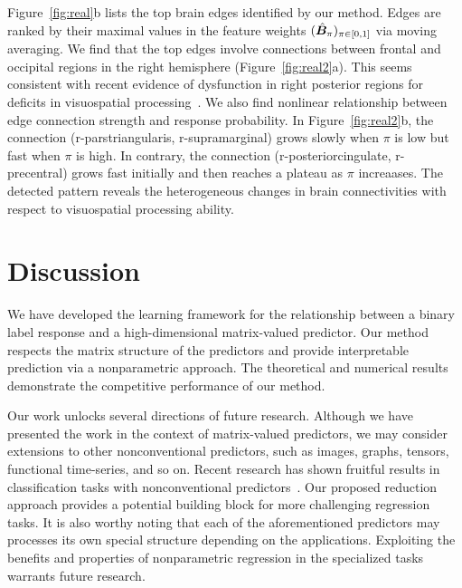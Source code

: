 \documentclass[11pt]{article}
\theoremstyle{plain}
\theoremstyle{definition}
\begin{document}
Figure~\ref{fig:real}b lists the top brain edges identified by our method. Edges are ranked by their maximal values in the feature weights $(\hat {\bm B}_\pi)_{\pi \in [0,1]}$ via moving averaging. We find that the top edges involve connections between frontal and occipital regions in the right hemisphere (Figure~\ref{fig:real2}a). This seems consistent with recent evidence of dysfunction in right posterior regions for deficits in visuospatial processing~\citep{wang2019common}. We also find nonlinear relationship between edge connection strength and response probability. In Figure~\ref{fig:real2}b, the connection (r-parstriangularis, r-supramarginal) grows slowly when $\pi$ is low but fast when $\pi$ is high. In contrary, the connection (r-posteriorcingulate, r-precentral) grows fast initially and then reaches a plateau as $\pi$ increaases. The detected pattern reveals the heterogeneous changes in brain connectivities with respect to visuospatial processing ability. 


\section{Discussion}
We have developed the learning framework for the relationship between a binary label response and a high-dimensional matrix-valued predictor. 
Our method respects the matrix structure of the predictors and provide interpretable prediction via a nonparametric approach. 
The theoretical and numerical results demonstrate the competitive performance of our method.

Our work unlocks several directions of future research. 
Although we have presented the work in the context of matrix-valued predictors, we may consider extensions to other nonconventional predictors, such as images, graphs, tensors, functional time-series, and so on. Recent research has shown fruitful results in classification tasks with nonconventional predictors~\citep{wang2016classification,arroyo2020simultaneous}. Our proposed reduction approach provides a potential building block for more challenging regression tasks. It is also worthy noting that each of the aforementioned predictors may processes its own special structure depending on the applications. Exploiting the benefits and properties of nonparametric regression in the specialized tasks warrants future research. 
\end{document}
